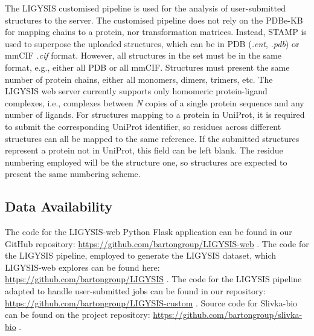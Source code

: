 The LIGYSIS customised pipeline is used for the analysis of user-submitted structures to the server. The customised pipeline does not rely on the PDBe-KB for mapping chains to a protein, nor transformation matrices. Instead, STAMP \cite{RUSSELL_1992_STAMP} is used to superpose the uploaded structures, which can be in PDB (\textit{.ent}, \textit{.pdb}) or mmCIF \textit{.cif}  format. However, all structures in the set must be in the same format, e.g., either all PDB or all mmCIF. Structures must present the same number of protein chains, either all monomers, dimers, trimers, etc. The LIGYSIS web server currently supports only homomeric protein-ligand complexes, i.e., complexes between \textit{N} copies of a single protein sequence and any number of ligands. For structures mapping to a protein in UniProt, it is required to submit the corresponding UniProt identifier, so residues across different structures can all be mapped to the same reference. If the submitted structures represent a protein not in UniProt, this field can be left blank. The residue numbering employed will be the structure one, so structures are expected to present the same numbering scheme.



\subsection{Data Availability}

The code for the LIGYSIS-web Python Flask application can be found in our GitHub repository: \url{https://github.com/bartongroup/LIGYSIS-web} \cite{UTGES_2024_LIGYSIS_WEB_ZENODO}. The code for the LIGYSIS pipeline, employed to generate the LIGYSIS dataset, which LIGYSIS-web explores can be found here: \url{https://github.com/bartongroup/LIGYSIS} \cite{UTGES_2024_LIGYSIS_ZENODO}. The code for the LIGYSIS pipeline adapted to handle user-submitted jobs can be found in our repository: \url{https://github.com/bartongroup/LIGYSIS-custom} \cite{UTGES_2024_LIGYSIS_CUSTOM_ZENODO}. Source code for Slivka-bio can be found on the project repository:  \url{https://github.com/bartongroup/slivka-bio} \cite{MACGOWAN_2020_DRSASP}. 


